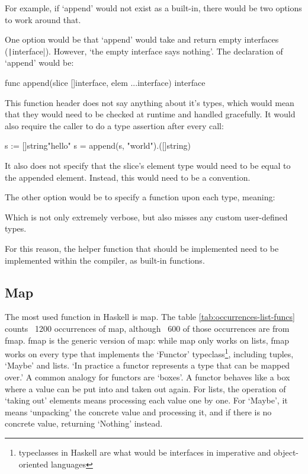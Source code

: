 For example, if `append' would not exist as a built-in, there would be two options
to work around that.

One option would be that `append' would take and return empty interfaces
(\texttt|interface{}|). However, `the empty interface says
nothing'\autocite{empty-interface}. The declaration of `append' would be:
\begin{gocode}
    func append(slice []interface{}, elem ...interface{}) {}interface
\end{gocode}

This function header does not say anything about it's types, which would
mean that they would need to be checked at runtime and handled gracefully. It
would also require the caller to do a type assertion after every call:

\begin{gocode}
    s := []string{"hello"}
    s = append(s, "world").([]string)
\end{gocode}

It also does not specify that the slice's element type would need to be equal to
the appended element. Instead, this would need to be a convention.

The other option would be to specify a function upon each type, meaning:
\begin{gocode}
func appendInt(slice []int, elem ...int} []int
func appendString(slice []string, elem ...string} []string
...
\end{gocode}

Which is not only extremely verbose, but also misses any custom user-defined types.

For this reason, the helper function that should  be implemented need to
be implemented within the compiler, as built-in functions.

\subsection{Map}

The most used function in Haskell is map. The table \ref{tab:occurrences-list-funcs}
counts ~1200 occurrences of map, although ~600 of those occurrences are from
fmap. fmap is the generic version of map: while map only works on lists, fmap
works on every type that implements the `Functor' typeclass\footnote{typeclasses
    in Haskell are what would be interfaces in imperative and object-oriented
languages}, including tuples, `Maybe' and lists.
`In practice a functor represents a type that can be mapped over.'\autocite{functor-wiki}
A common analogy for functors are `boxes'. A functor behaves like a box where
a value can be put into and taken out again. For lists, the operation of `taking out'
elements means processing each value one by one. For `Maybe', it means `unpacking' the
concrete value and processing it, and if there is no concrete value, returning `Nothing'
instead.

